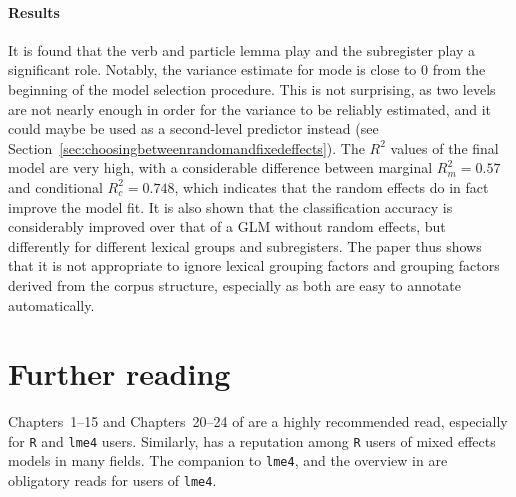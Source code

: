 \documentclass[a4paper,12pt]{article}
\begin{document}
\begin{mdframed}
  \paragraph{Results}

  It is found that the verb and particle lemma play and the subregister play a significant role.
  Notably, the variance estimate for mode is close to $0$ from the beginning of the model selection procedure.
  This is not surprising, as two levels are not nearly enough in order for the variance to be reliably estimated, and it could maybe be used as a second-level predictor instead (see Section~\ref{sec:choosingbetweenrandomandfixedeffects}).
  The $R^2$ values of the final model are very high, with a considerable difference between marginal $R^2_m=0.57$ and conditional $R^2_c=0.748$, which indicates that the random effects do in fact improve the model fit.
  It is also shown that the classification accuracy is considerably improved over that of a GLM without random effects, but differently for different lexical groups and subregisters.
  The paper thus shows that it is not appropriate to ignore lexical grouping factors and grouping factors derived from the corpus structure, especially as both are easy to annotate automatically.

\end{mdframed}

\section{Further reading}
\label{sec:furtherreading}

Chapters~1--15 and Chapters~20--24 of \citet{GelmanHill2006} are a highly recommended read, especially for \texttt{R} and \texttt{lme4} users.
Similarly, \citet{ZuurEa2009} has a reputation among \texttt{R} users of mixed effects models in many fields.
The companion to \texttt{lme4}, \citet{Bates2010} and the overview in \citet{BatesEa2015} are obligatory reads for users of \texttt{lme4}.

\printbibliography
\end{document}
